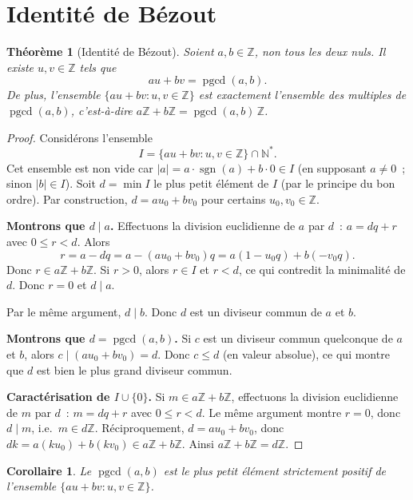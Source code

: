 \documentclass[12pt,a4paper,openany]{book}
\theoremstyle{definition}
\theoremstyle{plain}
\newtheorem{theoreme}[definition]{Théorème}
\newtheorem{corollaire}[definition]{Corollaire}
\theoremstyle{remark}
\newcommand{\N}{\mathbb{N}}
\newcommand{\Z}{\mathbb{Z}}
\newcommand{\abs}[1]{\left|#1\right|}
\DeclareMathOperator{\pgcd}{pgcd}
\begin{document}
\section{Identité de Bézout}
\label{sec:ch1:bezout}


\begin{theoreme}[Identité de Bézout]
\label{thm:bezout}
Soient $a, b \in \Z$, non tous les deux nuls. Il existe $u, v \in \Z$ tels que
\[
  au + bv = \pgcd(a,b).
\]
De plus, l'ensemble $\{au + bv : u, v \in \Z\}$ est exactement l'ensemble des
multiples de $\pgcd(a,b)$, c'est-à-dire $a\Z + b\Z = \pgcd(a,b)\,\Z$.
\end{theoreme}

\begin{proof}
Considérons l'ensemble
\[
  I = \{au + bv : u, v \in \Z\} \cap \N^*.
\]
Cet ensemble est non vide car $\abs{a} = a \cdot \operatorname{sgn}(a) + b \cdot 0
\in I$ (en supposant $a \neq 0$~; sinon $\abs{b} \in I$). Soit $d = \min I$ le
plus petit élément de $I$ (par le principe du bon ordre). Par construction,
$d = au_0 + bv_0$ pour certains $u_0, v_0 \in \Z$.

\textbf{Montrons que $d \mid a$.} Effectuons la division euclidienne de $a$ par $d$~:
$a = dq + r$ avec $0 \leq r < d$. Alors
\[
  r = a - dq = a - (au_0 + bv_0)q = a(1 - u_0 q) + b(-v_0 q).
\]
Donc $r \in a\Z + b\Z$. Si $r > 0$, alors $r \in I$ et $r < d$, ce qui contredit
la minimalité de $d$. Donc $r = 0$ et $d \mid a$.

Par le même argument, $d \mid b$. Donc $d$ est un diviseur commun de $a$ et $b$.

\textbf{Montrons que $d = \pgcd(a,b)$.} Si $c$ est un diviseur commun quelconque de
$a$ et $b$, alors $c \mid (au_0 + bv_0) = d$. Donc $c \leq d$ (en valeur absolue),
ce qui montre que $d$ est bien le plus grand diviseur commun.

\textbf{Caractérisation de $I \cup \{0\}$.} Si $m \in a\Z + b\Z$, effectuons la
division euclidienne de $m$ par $d$~: $m = dq + r$ avec $0 \leq r < d$. Le même
argument montre $r = 0$, donc $d \mid m$, i.e.\ $m \in d\Z$. Réciproquement,
$d = au_0 + bv_0$, donc $dk = a(ku_0) + b(kv_0) \in a\Z + b\Z$. Ainsi
$a\Z + b\Z = d\Z$.
\end{proof}

\begin{corollaire}
\label{cor:bezout:caract_pgcd}
Le $\pgcd(a,b)$ est le plus petit élément strictement positif de l'ensemble
$\{au + bv : u, v \in \Z\}$.
\end{corollaire}
\end{document}
